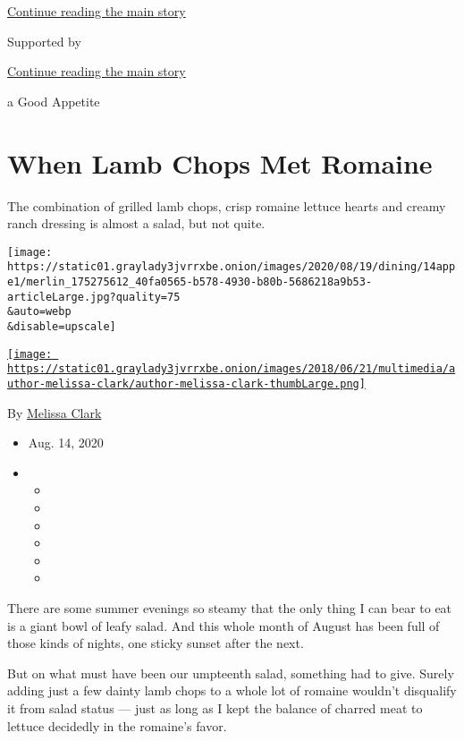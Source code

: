\protect\hyperlink{after-top}{Continue reading the main story}

Supported by

\protect\hyperlink{after-sponsor}{Continue reading the main story}

a Good Appetite

\hypertarget{when-lamb-chops-met-romaine}{%
\section{When Lamb Chops Met
Romaine}\label{when-lamb-chops-met-romaine}}

The combination of grilled lamb chops, crisp romaine lettuce hearts and
creamy ranch dressing is almost a salad, but not quite.

\texttt{[image: https://static01.graylady3jvrrxbe.onion/images/2020/08/19/dining/14appe1/merlin\_175275612\_40fa0565-b578-4930-b80b-5686218a9b53-articleLarge.jpg?quality=75\\\&auto=webp\\\&disable=upscale]}

\href{https://www.nytimes3xbfgragh.onion/by/melissa-clark}{\texttt{[image: https://static01.graylady3jvrrxbe.onion/images/2018/06/21/multimedia/author-melissa-clark/author-melissa-clark-thumbLarge.png]}}

By \href{https://www.nytimes3xbfgragh.onion/by/melissa-clark}{Melissa
Clark}

\begin{itemize}
\item
  Aug. 14, 2020
\item
  \begin{itemize}
  \item
  \item
  \item
  \item
  \item
  \item
  \end{itemize}
\end{itemize}

There are some summer evenings so steamy that the only thing I can bear
to eat is a giant bowl of leafy salad. And this whole month of August
has been full of those kinds of nights, one sticky sunset after the
next.

But on what must have been our umpteenth salad, something had to give.
Surely adding just a few dainty lamb chops to a whole lot of romaine
wouldn't disqualify it from salad status --- just as long as I kept the
balance of charred meat to lettuce decidedly in the romaine's favor.

